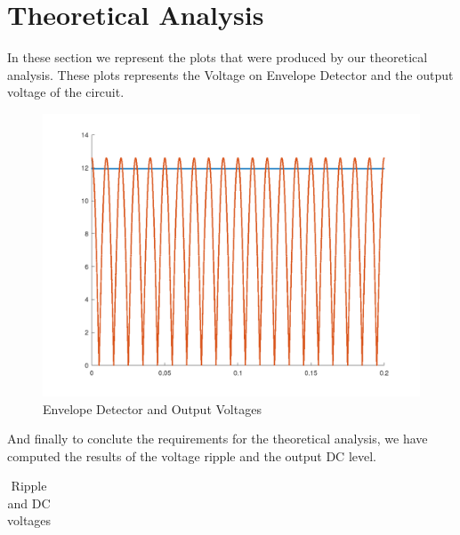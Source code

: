 \section{Theoretical Analysis}
\label{sec:analysis}

In these section we represent the plots that were produced by our theoretical analysis. These plots represents the Voltage on Envelope Detector and the output voltage of the circuit.



\FloatBarrier
\begin{figure}
  \includegraphics[width=\linewidth]{Condensador.png}
  \caption{Envelope Detector and Output Voltages}
  \label{fig:theoplots}
\end{figure}
\FloatBarrier

And finally to conclute the requirements for the theoretical analysis, we have computed the results of the voltage ripple and the output DC level.

\FloatBarrier
\begin{table}[h]
  \centering
  \begin{tabular}{|c|c|c|c|c|c|c|}
    \hline    
    
    \hline
  \end{tabular}
  \caption{Ripple and DC voltages}
  \label{tab:Octave}
\end{table}
\FloatBarrier 







